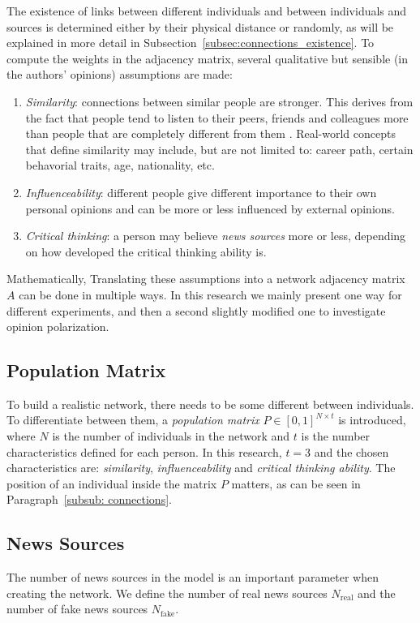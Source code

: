 The existence of links between different individuals and between individuals and sources is determined either by their physical distance or randomly, as will be explained in more detail in Subsection~\ref{subsec:connections_existence}.
To compute the weights in the adjacency matrix, several qualitative but sensible (in the authors' opinions) assumptions are made:
\renewcommand{\theenumi}{\roman{enumi}}
\begin{enumerate}
\item \textit{Similarity}: connections between similar people are stronger. This derives from the fact that people tend to listen to their peers, friends and colleagues more than people that are completely different from them \cite{Youyou2017}\cite{Afifi2013}. Real-world concepts that define similarity may include, but are not limited to: career path, certain behavorial traits, age, nationality, etc.
\item \textit{Influenceability}: different people give different importance to their own personal opinions and can be more or less influenced by external opinions.
\item \textit{Critical thinking}: a person may believe \textit{news sources} more or less, depending on how developed the critical thinking ability  is.
\end{enumerate}
Mathematically, 
Translating these assumptions into a network adjacency matrix $A$ can be done in multiple ways. In this research we mainly present one way for different experiments, and then a second slightly modified one to investigate opinion polarization. 
\subsection{Population Matrix}
To build a realistic network, there needs to be some different between individuals. To differentiate between them, a \textit{population matrix} $P \in {[0,1]}^{N \times t}$ is introduced, where $N$ is the number of individuals in the network and $t$ is the number characteristics defined for each person. In this research, $t=3$ and the chosen characteristics are: \textit{similarity}, \textit{influenceability} and \textit{critical thinking ability}. The position of an individual inside the matrix $P$ matters, as can be seen in Paragraph~\ref{subsub: connections}.
\subsection{News Sources}
The number of news sources in the model is an important parameter when creating the network. We define the number of real news sources $N_{\text{real}}$ and the number of fake news sources $N_{\text{fake}}$.
